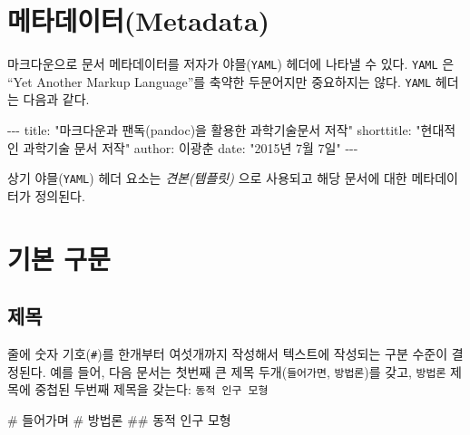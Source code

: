 \documentclass[
  letterpaper,
]{book}
\newenvironment{Shaded}{\begin{snugshade}}{\end{snugshade}}
\newcommand{\AttributeTok}[1]{\textcolor[rgb]{0.40,0.45,0.13}{#1}}
\newcommand{\CommentTok}[1]{\textcolor[rgb]{0.37,0.37,0.37}{#1}}
\newcommand{\FunctionTok}[1]{\textcolor[rgb]{0.28,0.35,0.67}{#1}}
\newcommand{\KeywordTok}[1]{\textcolor[rgb]{0.00,0.23,0.31}{#1}}
\newcommand{\PreprocessorTok}[1]{\textcolor[rgb]{0.68,0.00,0.00}{#1}}
\newcommand{\StringTok}[1]{\textcolor[rgb]{0.13,0.47,0.30}{#1}}
\begin{document}
\hypertarget{uxba54uxd0c0uxb370uxc774uxd130metadata}{%
\section{메타데이터(Metadata)}\label{uxba54uxd0c0uxb370uxc774uxd130metadata}}

마크다운으로 문서 메타데이터를 저자가 야믈(\texttt{YAML}) 헤더에 나타낼
수 있다. \texttt{YAML} 은 ``Yet Another Markup Language''를 축약한
두문어지만 중요하지는 않다. \texttt{YAML} 헤더는 다음과 같다.

\begin{Shaded}
\begin{Highlighting}[]
\PreprocessorTok{{-}{-}{-}}
\FunctionTok{title}\KeywordTok{:}\AttributeTok{ }\StringTok{"마크다운과 팬독(\textasciigrave{}pandoc\textasciigrave{})을 활용한 과학기술문서 저작"}
\FunctionTok{shorttitle}\KeywordTok{:}\AttributeTok{ }\StringTok{"현대적인 과학기술 문서 저작"}
\FunctionTok{author}\KeywordTok{:}\AttributeTok{ 이광춘}
\FunctionTok{date}\KeywordTok{:}\AttributeTok{ }\StringTok{"2015년 7월 7일"}
\PreprocessorTok{{-}{-}{-}}
\end{Highlighting}
\end{Shaded}

상기 야믈(\texttt{YAML}) 헤더 요소는 \emph{견본(템플릿)} 으로 사용되고
해당 문서에 대한 메타데이터가 정의된다.

\hypertarget{uxae30uxbcf8-uxad6cuxbb38}{%
\section{기본 구문}\label{uxae30uxbcf8-uxad6cuxbb38}}

\hypertarget{uxc81cuxbaa9}{%
\subsection{제목}\label{uxc81cuxbaa9}}

줄에 숫자 기호(\texttt{\#})를 한개부터 여섯개까지 작성해서 텍스트에
작성되는 구분 수준이 결정된다. 예를 들어, 다음 문서는 첫번째 큰 제목
두개(\texttt{들어가면}, \texttt{방법론})를 갖고, \texttt{방법론} 제목에
중첩된 두번째 제목을 갖는다: \texttt{동적\ 인구\ 모형}

\begin{Shaded}
\begin{Highlighting}[]
\CommentTok{\# 들어가며}
\CommentTok{\# 방법론}
\CommentTok{\#\# 동적 인구 모형}
\end{Highlighting}
\end{Shaded}
\end{document}

